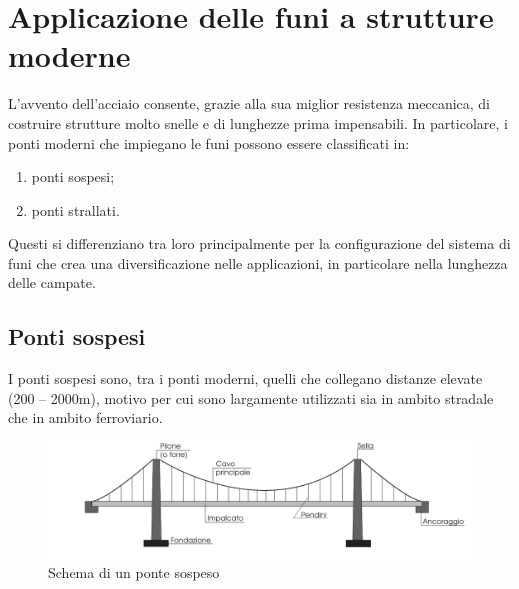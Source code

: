 

%
%
%


\section{Applicazione delle funi a strutture moderne}
L'avvento dell'acciaio consente, grazie alla sua miglior resistenza meccanica, di costruire strutture molto snelle e di lunghezze prima impensabili.
In particolare, i ponti moderni che impiegano le funi possono essere classificati in:
\begin{enumerate}
	\item ponti sospesi;
	\item ponti strallati.
\end{enumerate}

Questi si differenziano tra loro principalmente per la configurazione del sistema di funi che crea una diversificazione nelle applicazioni, in particolare nella lunghezza delle campate.

\subsection{Ponti sospesi}
I ponti sospesi sono, tra i ponti moderni, quelli che collegano distanze elevate (200 -- 2000\si{m}), motivo per cui sono largamente utilizzati sia in ambito stradale che in ambito ferroviario. 

\begin{figure}
	\centering
	\includegraphics[width=11.8cm, keepaspectratio]{Immagini/suspension_bridge}
	\caption{Schema di un ponte sospeso}
	\label{fig:ponte_sospeso}
\end{figure}


